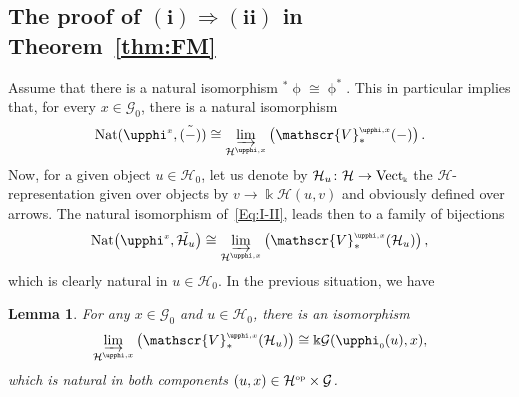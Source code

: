 \documentclass[10pt,a4paper]{amsart}
\numberwithin{equation}{section}
\newtheorem{Lemma}[Theorem]{Lemma}
\newcommand{\Vect}{{\rm Vect}_{\Sscript{\Bbbk}}}
\newcommand{\Go}{\cG_{\Sscript{0}}}
\newcommand{\Ho}{\cH_{\Sscript{0}}}
\newcommand{\vV}{\mathscr{V}}
\newcommand{\cG}{{\mathcal G}}
\newcommand{\cH}{{\mathcal H}}
\newcommand{\Sscript}[1]{\scriptscriptstyle{#1}}
\newcommand{\injlimit}[2]{\varinjlim_{#1}\left({#2}\right)}
\newcommand{\phio}{\upphi_{\Sscript{0}}}
\begin{document}
\subsection[The proof of $(i) \Rightarrow (ii)$ in Theorem~\ref{thm:FM}]{The proof of $\boldsymbol{(i) \Rightarrow (ii)}$ in Theorem~\ref{thm:FM}}\label{sssec:I-II}
Assume that there is a natural isomorphism ${}^{*}\upphi \cong \upphi^{*}$. This in particular implies that, for every $x \in \Go$, there is a natural isomorphism
\begin{gather}\label{Eq:I-II}
{\rm Nat}(\upphi^{\Sscript{x}}, \tilde{(-)}) \cong \injlimit{\cH^{\Sscript{\upphi, x}}}{\vV^{\Sscript{\upphi, x}}_*(-)}.
\end{gather}
Now, for a given object $u \in \Ho$, let us denote by $\cH_{u}\colon \cH \to \Vect$ the $\cH$-representation given over objects by $v \to \Bbbk \cH(u, v)$ and obviously defined over arrows. The natural isomorphism of~\eqref{Eq:I-II}, leads then to a family of bijections
\begin{gather*}
{\rm Nat}\big(\upphi^{\Sscript{x}}, \tilde{\cH_{u}}\big) \cong \injlimit{\cH^{\Sscript{\upphi, x}}}{\vV^{\Sscript{\upphi, x}}_*(\cH_{u})},
\end{gather*}
which is clearly natural in $u \in \Ho$. In the previous situation, we have
\begin{Lemma}\label{lema:I-II-1} For any $x \in\Go$ and $u \in \Ho$, there is an isomorphism
\begin{gather*}
\injlimit{\cH^{\Sscript{\upphi, x}}}{\vV^{\Sscript{\upphi,x}}_*(\cH_{u})} \cong \Bbbk \cG(\phio(u),x),
\end{gather*}
which is natural in both components $(u, x) \in \cH^{\Sscript{\rm op}} \times \cG$.
\end{Lemma}
\end{document}
